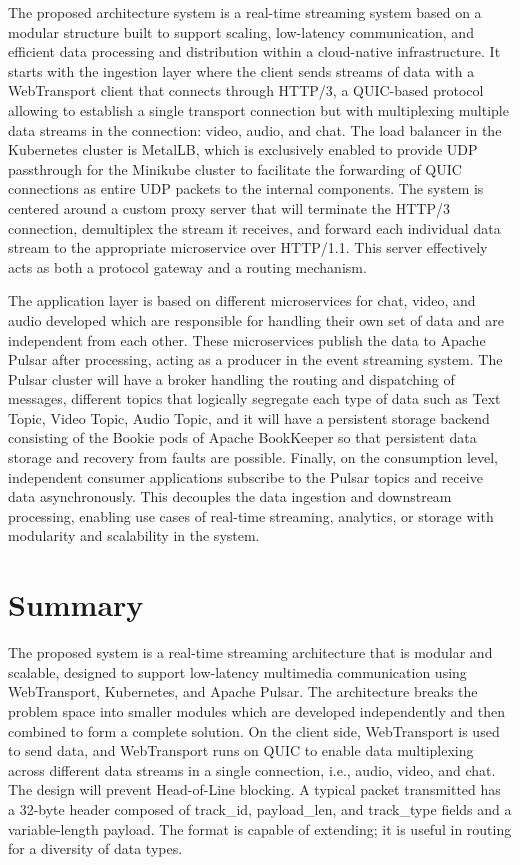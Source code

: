The proposed architecture system is a real-time streaming system based on a modular structure built to support scaling, low-latency communication, and efficient data processing and distribution within a cloud-native infrastructure. It starts with the ingestion layer where the client sends streams of data with a WebTransport client that connects through HTTP/3, a QUIC-based protocol allowing to establish a single transport connection but with multiplexing multiple data streams in the connection: video, audio, and chat. The load balancer in the Kubernetes cluster is MetalLB, which is exclusively enabled to provide UDP passthrough for the Minikube cluster to facilitate the forwarding of QUIC connections as entire UDP packets to the internal components. The system is centered around a custom proxy server that will terminate the HTTP/3 connection, demultiplex the stream it receives, and forward each individual data stream to the appropriate microservice over HTTP/1.1. This server effectively acts as both a protocol gateway and a routing mechanism.

The application layer is based on different microservices for chat, video, and audio developed which are responsible for handling their own set of data and are independent from each other. These microservices publish the data to Apache Pulsar after processing, acting as a producer in the event streaming system. The Pulsar cluster will have a broker handling the routing and dispatching of messages, different topics that logically segregate each type of data such as Text Topic, Video Topic, Audio Topic, and it will have a persistent storage backend consisting of the Bookie pods of Apache BookKeeper so that persistent data storage and recovery from faults are possible. Finally, on the consumption level, independent consumer applications subscribe to the Pulsar topics and receive data asynchronously. This decouples the data ingestion and downstream processing, enabling use cases of real-time streaming, analytics, or storage with modularity and scalability in the system.
\label{sec:OverviewOfDesign}

\section{Summary}
The proposed system is a real-time streaming architecture that is modular and scalable, designed to support low-latency multimedia communication using WebTransport, Kubernetes, and Apache Pulsar. The architecture breaks the problem space into smaller modules which are developed independently and then combined to form a complete solution. On the client side, WebTransport is used to send data, and WebTransport runs on QUIC to enable data multiplexing across different data streams in a single connection, i.e., audio, video, and chat. The design will prevent Head-of-Line blocking. A typical packet transmitted has a 32-byte header composed of track\_id, payload\_len, and track\_type fields and a variable-length payload. The format is capable of extending; it is useful in routing for a diversity of data types.

